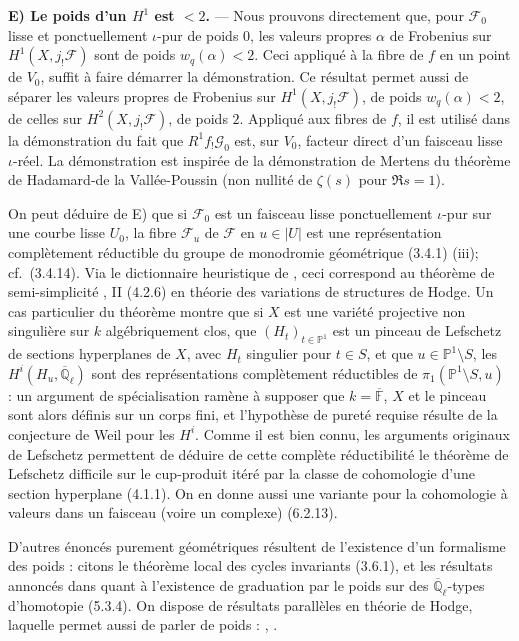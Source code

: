 \documentclass[12pt,a4paper]{article}
\theoremstyle{plain}
\theoremstyle{definition}
\theoremstyle{definition}
\theoremstyle{remark}
\begin{document}
\medskip
\textbf{E) Le poids d'un $H^1$ est $< 2$.} --- Nous prouvons directement que, pour $\mathscr{F}_0$ lisse et ponctuellement $\iota$-pur de poids $0$, les valeurs propres $\alpha$ de Frobenius sur $H^1(X, j_! \mathscr{F})$ sont de poids $w_q(\alpha) < 2$. Ceci appliqu\'e \`a la fibre de $f$ en un point de $V_0$, suffit \`a faire d\'emarrer la d\'emonstration. Ce r\'esultat permet aussi de s\'eparer les valeurs propres de Frobenius sur $H^1(X, j_! \mathscr{F})$, de poids $w_q(\alpha) < 2$, de celles sur $H^2(X, j_! \mathscr{F})$, de poids $2$. Appliqu\'e aux fibres de $f$, il est utilis\'e dans la d\'emonstration du fait que $R^1 f_! \mathscr{G}_0$ est, sur $V_0$, facteur direct d'un faisceau lisse $\iota$-r\'eel. La d\'emonstration est inspir\'ee de la d\'emonstration de Mertens du th\'eor\`eme de Hadamard-de la Vall\'ee-Poussin (non nullit\'e de $\zeta(s)$ pour $\Re s = 1$).

On peut d\'eduire de E) que si $\mathscr{F}_0$ est un faisceau lisse ponctuellement $\iota$-pur sur une courbe lisse $U_0$, la fibre $\mathscr{F}_u$ de $\mathscr{F}$ en $u \in |U|$ est une repr\'esentation compl\`etement r\'eductible du groupe de monodromie g\'eom\'etrique (3.4.1) (iii); cf.~(3.4.14). Via le dictionnaire heuristique de \cite{HodgeI}, ceci correspond au th\'eor\`eme de semi-simplicit\'e \cite{HodgeII}, II (4.2.6) en th\'eorie des variations de structures de Hodge. Un cas particulier du th\'eor\`eme montre que si $X$ est une vari\'et\'e projective non singuli\`ere sur $k$ alg\'ebriquement clos, que $(H_t)_{t \in \mathbb{P}^1}$ est un pinceau de Lefschetz de sections hyperplanes de $X$, avec $H_t$ singulier pour $t \in S$, et que $u \in \mathbb{P}^1 \setminus S$, les $H^i(H_u, \overline{\mathbb{Q}}_\ell)$ sont des repr\'esentations compl\`etement r\'eductibles de $\pi_1(\mathbb{P}^1 \setminus S, u)$ : un argument de sp\'ecialisation ram\`ene \`a supposer que $k = \overline{\mathbb{F}}$, $X$ et le pinceau sont alors d\'efinis sur un corps fini, et l'hypoth\`ese de puret\'e requise r\'esulte de la conjecture de Weil pour les $H^i$. Comme il est bien connu, les arguments originaux de Lefschetz permettent de d\'eduire de cette compl\`ete r\'eductibilit\'e le th\'eor\`eme de Lefschetz difficile sur le cup-produit it\'er\'e par la classe de cohomologie d'une section hyperplane (4.1.1). On en donne aussi une variante pour la cohomologie \`a valeurs dans un faisceau (voire un complexe) (6.2.13).

D'autres \'enonc\'es purement g\'eom\'etriques r\'esultent de l'existence d'un formalisme des poids : citons le th\'eor\`eme local des cycles invariants (3.6.1), et les r\'esultats annonc\'es dans \cite{Berlin} quant \`a l'existence de graduation par le poids sur des $\overline{\mathbb{Q}}_\ell$-types d'homotopie (5.3.4). On dispose de r\'esultats parall\`eles en th\'eorie de Hodge, laquelle permet aussi de parler de poids : \cite{Schmid}, \cite{Steenbrink}.
\end{document}

